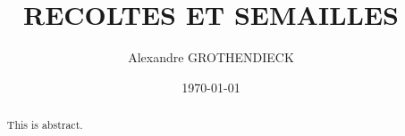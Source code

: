 \documentclass{article}
\begin{document}
\title{RECOLTES ET SEMAILLES}

\author{Alexandre GROTHENDIECK}
\date{\today}

\begin{abstract}
    This is abstract.
\end{abstract}
\maketitle


\tableofcontents







\end{document}
